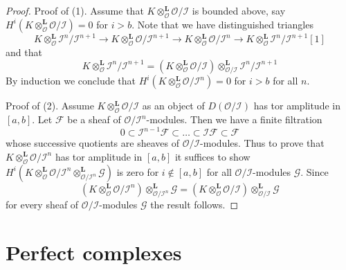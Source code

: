 \begin{proof}
Proof of (1). Assume that
$K \otimes_\mathcal{O}^\mathbf{L} \mathcal{O}/\mathcal{I}$
is bounded above, say
$H^i(K \otimes_\mathcal{O}^\mathbf{L} \mathcal{O}/\mathcal{I}) = 0$
for $i > b$. Note that we have distinguished triangles
$$
K \otimes_\mathcal{O}^\mathbf{L}
\mathcal{I}^n/\mathcal{I}^{n + 1} \to
K \otimes_\mathcal{O}^\mathbf{L}
\mathcal{O}/\mathcal{I}^{n + 1} \to
K \otimes_\mathcal{O}^\mathbf{L}
\mathcal{O}/\mathcal{I}^n \to
K \otimes_\mathcal{O}^\mathbf{L}
\mathcal{I}^n/\mathcal{I}^{n + 1}[1]
$$
and that
$$
K \otimes_\mathcal{O}^\mathbf{L}
\mathcal{I}^n/\mathcal{I}^{n + 1} =
\left(
K \otimes_\mathcal{O}^\mathbf{L}
\mathcal{O}/\mathcal{I}\right)
\otimes_{\mathcal{O}/\mathcal{I}}^\mathbf{L}
\mathcal{I}^n/\mathcal{I}^{n + 1}
$$
By induction we conclude that
$H^i(K \otimes_\mathcal{O}^\mathbf{L} \mathcal{O}/\mathcal{I}^n) = 0$
for $i > b$ for all $n$.

\medskip\noindent
Proof of (2). Assume $K \otimes_\mathcal{O}^\mathbf{L} \mathcal{O}/\mathcal{I}$
as an object of $D(\mathcal{O}/\mathcal{I})$ has tor amplitude in $[a, b]$.
Let $\mathcal{F}$ be a sheaf of $\mathcal{O}/\mathcal{I}^n$-modules.
Then we have a finite filtration
$$
0 \subset \mathcal{I}^{n - 1}\mathcal{F} \subset \ldots
\subset \mathcal{I}\mathcal{F} \subset \mathcal{F}
$$
whose successive quotients are sheaves of $\mathcal{O}/\mathcal{I}$-modules.
Thus to prove that $K \otimes_\mathcal{O}^\mathbf{L} \mathcal{O}/\mathcal{I}^n$
has tor amplitude in $[a, b]$ it suffices to show
$H^i(K \otimes_\mathcal{O}^\mathbf{L} \mathcal{O}/\mathcal{I}^n
\otimes_{\mathcal{O}/\mathcal{I}^n}^\mathbf{L} \mathcal{G})$
is zero for $i \not \in [a, b]$ for all $\mathcal{O}/\mathcal{I}$-modules
$\mathcal{G}$. Since
$$
\left(K \otimes_\mathcal{O}^\mathbf{L} \mathcal{O}/\mathcal{I}^n\right)
\otimes_{\mathcal{O}/\mathcal{I}^n}^\mathbf{L} \mathcal{G}
=
\left(K \otimes_\mathcal{O}^\mathbf{L} \mathcal{O}/\mathcal{I}\right)
\otimes_{\mathcal{O}/\mathcal{I}}^\mathbf{L} \mathcal{G}
$$
for every sheaf of $\mathcal{O}/\mathcal{I}$-modules $\mathcal{G}$
the result follows.
\end{proof}










\section{Perfect complexes}
\label{section-perfect}

